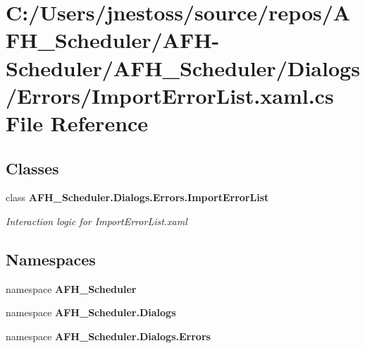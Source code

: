 \section{C\+:/\+Users/jnestoss/source/repos/\+A\+F\+H\+\_\+\+Scheduler/\+A\+F\+H-\/\+Scheduler/\+A\+F\+H\+\_\+\+Scheduler/\+Dialogs/\+Errors/\+Import\+Error\+List.xaml.\+cs File Reference}
\label{_import_error_list_8xaml_8cs}
\subsection*{Classes}
\begin{DoxyCompactItemize}
\item 
class \textbf{ A\+F\+H\+\_\+\+Scheduler.\+Dialogs.\+Errors.\+Import\+Error\+List}
\begin{DoxyCompactList}\small\item\em Interaction logic for Import\+Error\+List.\+xaml \end{DoxyCompactList}\end{DoxyCompactItemize}
\subsection*{Namespaces}
\begin{DoxyCompactItemize}
\item 
namespace \textbf{ A\+F\+H\+\_\+\+Scheduler}
\item 
namespace \textbf{ A\+F\+H\+\_\+\+Scheduler.\+Dialogs}
\item 
namespace \textbf{ A\+F\+H\+\_\+\+Scheduler.\+Dialogs.\+Errors}
\end{DoxyCompactItemize}
